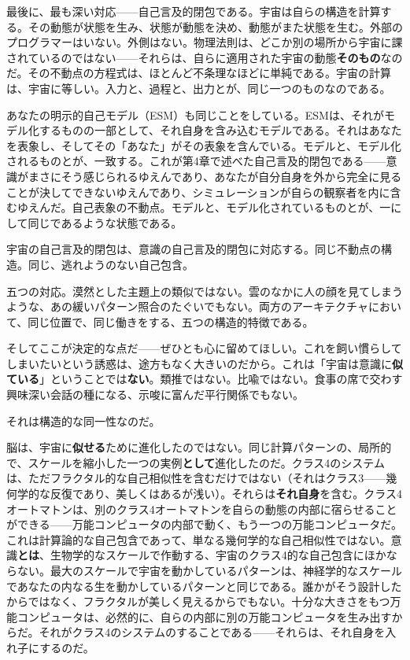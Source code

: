 \documentclass[11pt, twoside, openright]{book}
\begin{document}
最後に、最も深い対応------自己言及的閉包である。宇宙は自らの構造を計算する。その動態が状態を生み、状態が動態を決め、動態がまた状態を生む。外部のプログラマーはいない。外側はない。物理法則は、どこか別の場所から宇宙に課されているのではない------それらは、自らに適用された宇宙の動態\textbf{そのもの}なのだ。その不動点の方程式は、ほとんど不条理なほどに単純である。宇宙の計算は、宇宙に等しい。入力と、過程と、出力とが、同じ一つのものなのである。

あなたの明示的自己モデル（ESM）も同じことをしている。ESMは、それがモデル化するものの一部として、それ自身を含み込むモデルである。それはあなたを表象し、そしてその「あなた」がその表象を含んでいる。モデルと、モデル化されるものとが、一致する。これが第4章で述べた自己言及的閉包である------意識がまさにそう感じられるゆえんであり、あなたが自分自身を外から完全に見ることが決してできないゆえんであり、シミュレーションが自らの観察者を内に含むゆえんだ。自己表象の不動点。モデルと、モデル化されているものとが、一にして同じであるような状態である。

宇宙の自己言及的閉包は、意識の自己言及的閉包に対応する。同じ不動点の構造。同じ、逃れようのない自己包含。

五つの対応。漠然とした主題上の類似ではない。雲のなかに人の顔を見てしまうような、あの緩いパターン照合のたぐいでもない。両方のアーキテクチャにおいて、同じ位置で、同じ働きをする、五つの構造的特徴である。

そしてここが決定的な点だ------ぜひとも心に留めてほしい。これを飼い慣らしてしまいたいという誘惑は、途方もなく大きいのだから。これは「宇宙は意識に\textbf{似ている}」ということでは\textbf{ない}。類推ではない。比喩ではない。食事の席で交わす興味深い会話の種になる、示唆に富んだ平行関係でもない。

それは構造的な同一性なのだ。

脳は、宇宙に\textbf{似せる}ために進化したのではない。同じ計算パターンの、局所的で、スケールを縮小した一つの実例\textbf{として}進化したのだ。クラス4のシステムは、ただフラクタル的な自己相似性を含むだけではない（それはクラス3------幾何学的な反復であり、美しくはあるが浅い）。それらは\textbf{それ自身}を含む。クラス4オートマトンは、別のクラス4オートマトンを自らの動態の内部に宿らせることができる------万能コンピュータの内部で動く、もう一つの万能コンピュータだ。これは計算論的な自己包含であって、単なる幾何学的な自己相似性ではない。意識\textbf{とは}、生物学的なスケールで作動する、宇宙のクラス4的な自己包含にほかならない。最大のスケールで宇宙を動かしているパターンは、神経学的なスケールであなたの内なる生を動かしているパターンと同じである。誰かがそう設計したからではなく、フラクタルが美しく見えるからでもない。十分な大きさをもつ万能コンピュータは、必然的に、自らの内部に別の万能コンピュータを生み出すからだ。それがクラス4のシステムのすることである------それらは、それ自身を入れ子にするのだ。
\end{document}
